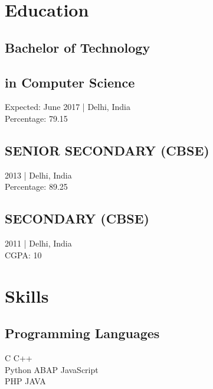 \documentclass[]{resume-openfont}
\begin{document}
%
%



%
%

\begin{minipage}[t]{0.31\textwidth} 


\section{Education} 

\subsection{Bachelor of Technology} \subsection{in Computer Science}
Expected: June 2017 | Delhi, India \\ Percentage: 79.15
\sectionsep

\subsection{SENIOR SECONDARY (CBSE)}
2013 | Delhi, India \\ Percentage: 89.25
\sectionsep

\subsection{SECONDARY (CBSE)}
2011 | Delhi, India \\ CGPA: 10
\sectionsep


\section{Skills}
\subsection{Programming Languages}
C \textbullet{} C++ \\
Python \textbullet{} ABAP \textbullet{} JavaScript\\
PHP \textbullet{} JAVA \\
\sectionsep

\end{minipage}
\end{document}
